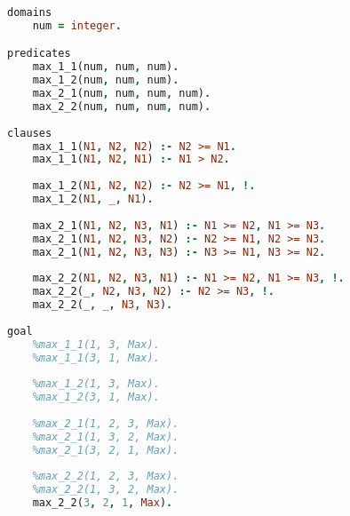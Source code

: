 \documentclass[12pt]{report}
\begin{document}
\begin{lstlisting}[language=Prolog]
domains
	num = integer.

predicates
	max_1_1(num, num, num).
	max_1_2(num, num, num).
	max_2_1(num, num, num, num).
	max_2_2(num, num, num, num).
	
clauses
	max_1_1(N1, N2, N2) :- N2 >= N1.
	max_1_1(N1, N2, N1) :- N1 > N2.
	
	max_1_2(N1, N2, N2) :- N2 >= N1, !.
	max_1_2(N1, _, N1).
	
	max_2_1(N1, N2, N3, N1) :- N1 >= N2, N1 >= N3.
	max_2_1(N1, N2, N3, N2) :- N2 >= N1, N2 >= N3.
	max_2_1(N1, N2, N3, N3) :- N3 >= N1, N3 >= N2.
	
	max_2_2(N1, N2, N3, N1) :- N1 >= N2, N1 >= N3, !.
	max_2_2(_, N2, N3, N2) :- N2 >= N3, !.
	max_2_2(_, _, N3, N3).
	
goal
	%max_1_1(1, 3, Max).
	%max_1_1(3, 1, Max).
	
	%max_1_2(1, 3, Max).
	%max_1_2(3, 1, Max).
	
	%max_2_1(1, 2, 3, Max).
	%max_2_1(1, 3, 2, Max).
	%max_2_1(3, 2, 1, Max).
	
	%max_2_2(1, 2, 3, Max).
	%max_2_2(1, 3, 2, Max).
	max_2_2(3, 2, 1, Max).
 
\end{lstlisting}



	
\end{document}
